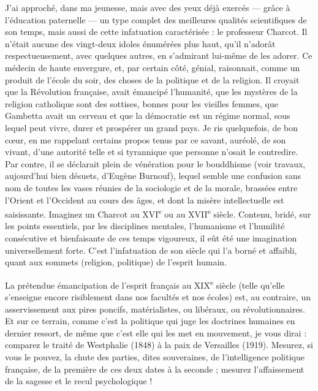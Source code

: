 \documentclass[french,twoside]{book} %
\begin{document}
J’ai approché, dans ma jeunesse, mais avec des yeux déjà exercés — grâce à l’éducation paternelle — un type complet des meilleures qualités scientifiques de son temps, mais aussi de cette infatuation caractérisée : le professeur Charcot. Il n’était aucune des vingt-deux idoles énumérées plus haut, qu’il n’adorât respectueusement, avec quelques autres, en s’admirant lui-même de les adorer. Ce médecin de haute envergure, et, par certain côté, génial, raisonnait, comme un produit de l’école du soir, des choses de la politique et de la religion. Il croyait que la Révolution française, avait émancipé l’humanité, que les mystères de la religion catholique sont des sottises, bonnes pour les vieilles femmes, que Gambetta avait un cerveau et que la démocratie est un régime normal, sous lequel peut vivre, durer et prospérer un grand pays. Je ris quelquefois, de bon cœur, en me rappelant certains propos tenus par ce savant, auréolé, de son vivant, d’une autorité telle et si tyrannique que personne n’osait le contredire. Par contre, il se déclarait plein de vénération pour le bouddhisme (voir travaux, aujourd’hui bien désuets, d’Eugène Burnouf), lequel semble une confusion sans nom de toutes les vases réunies de la sociologie et de la morale, brassées entre l’Orient et l’Occident au cours des âges, et dont la misère intellectuelle est saisissante. Imaginez un Charcot au XVI\textsuperscript{e} ou au XVII\textsuperscript{e} siècle. Contenu, bridé, sur les points essentiels, par les disciplines mentales, l’humanisme et l’humilité consécutive et bienfaisante de ces temps vigoureux, il eût été une imagination universellement forte. C’est l’infatuation de son siècle qui l’a borné et affaibli, quant aux sommets (religion, politique) de l’esprit humain.\par
La prétendue émancipation de l’esprit français au XIX\textsuperscript{e} siècle (telle qu’elle s’enseigne encore risiblement dans nos facultés et nos écoles) est, au contraire, un asservissement aux pires poncifs, matérialistes, ou libéraux, ou révolutionnaires. Et sur ce terrain, comme c’est la politique qui juge les doctrines humaines en dernier ressort, de même que c’est elle qui les met en mouvement, je vous dirai : comparez le traité de Westphalie (1848) à la paix de Versailles (1919). Mesurez, si vous le pouvez, la chute des parties, dites souveraines, de l’intelligence politique française, de la première de ces deux dates à la seconde ; mesurez l’affaissement de la sagesse et le recul psychologique !\par
\end{document}
